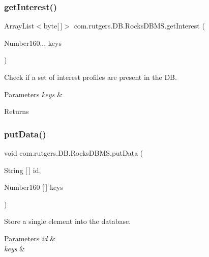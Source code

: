 \subsubsection{\texorpdfstring{get\+Interest()}{getInterest()}}
{\footnotesize\ttfamily Array\+List$<$byte\mbox{[}$\,$\mbox{]}$>$ com.\+rutgers.\+D\+B.\+Rocks\+D\+B\+M\+S.\+get\+Interest (\begin{DoxyParamCaption}\item[{Number160...}]{keys }\end{DoxyParamCaption})}

Check if a set of interest profiles are present in the DB. 
\begin{DoxyParams}{Parameters}
{\em keys} & \\
\hline
\end{DoxyParams}
\begin{DoxyReturn}{Returns}

\end{DoxyReturn}
\mbox{\label{classcom_1_1rutgers_1_1DB_1_1RocksDBMS_a3457d063685184152707f7e25b7bcb6c}} 
\subsubsection{\texorpdfstring{put\+Data()}{putData()}\hspace{0.1cm}{\footnotesize\ttfamily [1/2]}}
{\footnotesize\ttfamily void com.\+rutgers.\+D\+B.\+Rocks\+D\+B\+M\+S.\+put\+Data (\begin{DoxyParamCaption}\item[{String \mbox{[}$\,$\mbox{]}}]{id,  }\item[{Number160 \mbox{[}$\,$\mbox{]}}]{keys }\end{DoxyParamCaption})}

Store a single element into the database. 
\begin{DoxyParams}{Parameters}
{\em id} & \\
\hline
{\em keys} & \\
\hline
\end{DoxyParams}
\mbox{\label{classcom_1_1rutgers_1_1DB_1_1RocksDBMS_a8f19edec5bd60c75362223c880cd8a2f}} 
